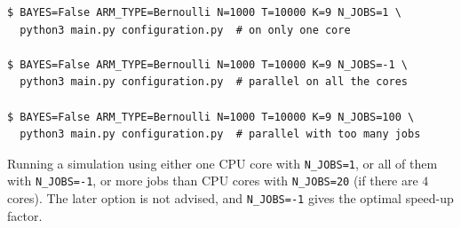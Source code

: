 \begin{small}
    \begin{listing}[h!]
        \begin{verbatim}
$ BAYES=False ARM_TYPE=Bernoulli N=1000 T=10000 K=9 N_JOBS=1 \
  python3 main.py configuration.py  # on only one core

$ BAYES=False ARM_TYPE=Bernoulli N=1000 T=10000 K=9 N_JOBS=-1 \
  python3 main.py configuration.py  # parallel on all the cores

$ BAYES=False ARM_TYPE=Bernoulli N=1000 T=10000 K=9 N_JOBS=100 \
  python3 main.py configuration.py  # parallel with too many jobs
        \end{verbatim}
        \caption{Running a simulation using either one CPU core with \texttt{N\_JOBS=1}, or all of them with \texttt{N\_JOBS=-1}, or more jobs than CPU cores with \texttt{N\_JOBS=20} (if there are $4$ cores). The later option is not advised, and \texttt{N\_JOBS=-1} gives the optimal speed-up factor.}
        \label{lst:3:runOneCoreOrMore}
    \end{listing}
\end{small}


